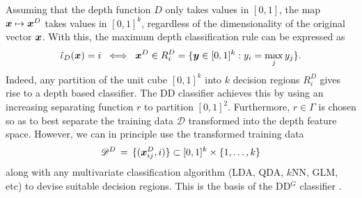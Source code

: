 Assuming that the depth function $D$ only takes values in $[0, 1]$, the map
$\bm{x} \mapsto \bm{x}^D$ takes values in $[0, 1]^k$, regardless of the
dimensionality of the original vector $\bm{x}$.
With this, the maximum depth classification rule can be expressed as
\begin{equation}
    \hat{\iota}_D(\bm{x}) = i \;\iff\; \bm{x}^D \in R_i^D = \{\bm{y} \in [0, 1]^k : y_i = \max_j y_j\}.
\end{equation}
Indeed, any partition of the unit cube $[0, 1]^k$ into $k$ decision regions
$R^D_i$ gives rise to a depth based classifier.
The DD classifier achieves this by using an increasing separating function
$r$ to partition $[0, 1]^2$.
Furthermore, $r \in \Gamma$ is chosen so as to best separate the training data
$\mathscr{D}$ transformed into the depth feature space.
However, we can in principle use the transformed training data
\begin{equation}
    \mathscr{D}^D \,=\, \{(\bm{x}^D_{ij}, i)\} \subset [0, 1]^k \times \{1, \dots, k\}
\end{equation}
along with any multivariate classification algorithm (LDA, QDA, $k$NN, GLM,
etc) to devise suitable decision regions.
This is the basis of the DD$^G$ classifier
\parencite{albertos-bande-fuente-2017}.


